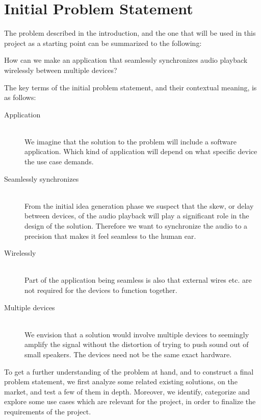 \section{Initial Problem Statement}\label{sec:initial_problem}

The problem described in the introduction, and the one that will be used
in this project as a starting point can be summarized to the following:

\begin{problemstatement}
	How can we make an application that seamlessly synchronizes audio
	playback wirelessly between multiple devices?
\end{problemstatement}

The key terms of the initial problem statement, and their contextual meaning,
is as follows:
\begin{description}
	\item[Application] \hfill \\
		We imagine that the solution to the problem will include a software
		application. Which kind of application will depend on what specific
		device the use case demands.
	\item[Seamlessly synchronizes]  \hfill \\
		From the initial idea generation phase we suspect
		that the skew, or delay between devices, of the audio playback will
		play a significant role in the design of the solution. Therefore we
		want to synchronize the audio to a precision that makes it feel
		seamless to the human ear.
	\item[Wirelessly]  \hfill \\
		Part of the application being seamless is also that external wires etc. are 
		not required for the devices to function together.
	\item[Multiple devices]  \hfill \\
		We envision that a solution would involve multiple devices to seemingly 
		amplify the signal without the distortion of trying to push sound out of
		small speakers. The devices need not be the same exact hardware.
\end{description}

To get a further understanding of the problem at hand, and to
construct a final problem statement, we first analyze some related
existing solutions, on the market, and test a few of them in depth. 
Moreover, we identify, categorize and explore some use cases which are relevant for the project,
in order to finalize the requirements of the project.
